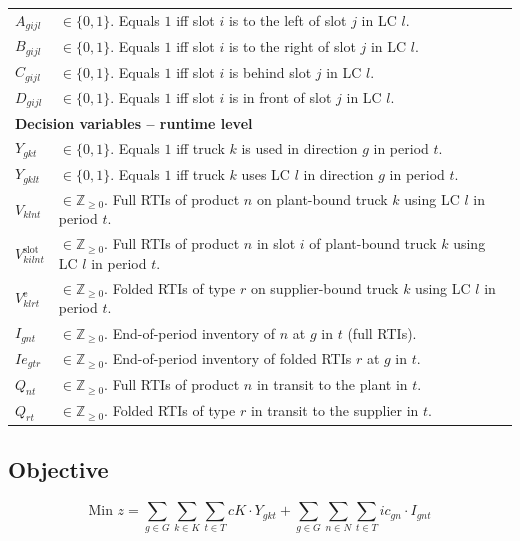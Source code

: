 \begin{longtable}[hbt!]{|p{}|p{}|}
    $A_{gijl}$       & $\in\{0,1\}$. Equals $1$ iff slot $i$ is to the left of slot $j$ in LC $l$.\\
    $B_{gijl}$       & $\in\{0,1\}$. Equals $1$ iff slot $i$ is to the right of slot $j$ in LC $l$.\\
    $C_{gijl}$       & $\in\{0,1\}$. Equals $1$ iff slot $i$ is behind slot $j$ in LC $l$.\\
    $D_{gijl}$       & $\in\{0,1\}$. Equals $1$ iff slot $i$ is in front of slot $j$ in LC $l$.\\
    \hline
    \multicolumn{2}{|l|}{\textbf{Decision variables -- runtime level}}\\\hline
    $Y_{gkt}$        & $\in\{0,1\}$. Equals $1$ iff truck $k$ is used in direction $g$ in period $t$.\\
    $Y_{gklt}$       & $\in\{0,1\}$. Equals $1$ iff truck $k$ uses LC $l$ in direction $g$ in period $t$.\\
    $V_{klnt}$       & $\in\mathbb{Z}_{\ge 0}$. Full RTIs of product $n$ on plant-bound truck $k$ using LC $l$ in period $t$.\\
    $V^{\mathrm{slot}}_{kilnt}$ & $\in\mathbb{Z}_{\ge 0}$. Full RTIs of product $n$ in slot $i$ of plant-bound truck $k$ using LC $l$ in period $t$.\\
    $V^{\mathrm{e}}_{klrt}$ & $\in\mathbb{Z}_{\ge 0}$. Folded RTIs of type $r$ on supplier-bound truck $k$ using LC $l$ in period $t$.\\
    $I_{gnt}$        & $\in\mathbb{Z}_{\ge 0}$. End-of-period inventory of $n$ at $g$ in $t$ (full RTIs).\\
    $Ie_{gtr}$       & $\in\mathbb{Z}_{\ge 0}$. End-of-period inventory of folded RTIs $r$ at $g$ in $t$.\\
    $Q_{nt}$         & $\in\mathbb{Z}_{\ge 0}$. Full RTIs of product $n$ in transit to the plant in $t$.\\
    $Q_{rt}$         & $\in\mathbb{Z}_{\ge 0}$. Folded RTIs of type $r$ in transit to the supplier in $t$.\\
    \hline
\end{longtable}

\subsection*{Objective}

\begin{equation}
\text{Min } z
= \sum_{g\in G}\sum_{k\in K}\sum_{t\in T} cK\cdot Y_{gkt}
+ \sum_{g\in G}\sum_{n\in N}\sum_{t\in T} ic_{gn}\cdot I_{gnt}
\label{sb:eq:obj}
\end{equation}

